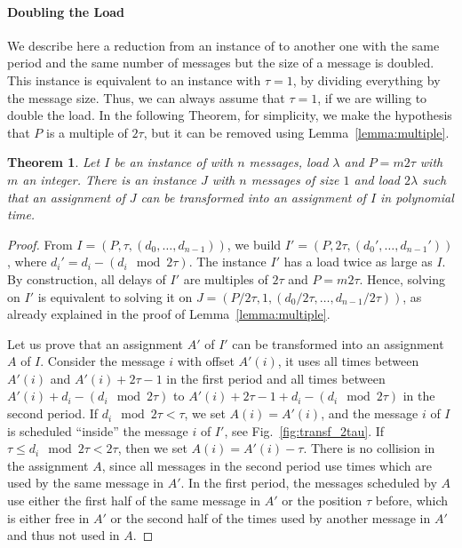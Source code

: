 \documentclass[pdflatex,sn-mathphys,iicol]{sn-jnl}%
\theoremstyle{thmstyleone}%
\newtheorem{theorem}{Theorem}%
\theoremstyle{thmstyletwo}%
\theoremstyle{thmstylethree}%
\begin{document}
\paragraph*{Doubling the Load}

We describe here a reduction from an instance of \pma to another one with the same period and the same number of messages but the size of a message is doubled. This instance is equivalent to an instance with $\tau = 1$, by dividing everything by the message size. Thus, we can always assume that $\tau = 1$, if we are willing to double the load. In the following Theorem, for simplicity, we make the hypothesis that $P$ is a multiple of $2\tau$, but it can be removed using Lemma~\ref{lemma:multiple}. 


\begin{theorem}\label{th:double_load}
Let $I$ be an instance of \pma with $n$ messages, load $\lambda$ and $P=m2\tau$ with $m$ an integer. There is an instance $J$ with $n$ messages of size $1$ and load $2\lambda$ such that an assignment of $J$ can be transformed into an assignment of $I$ in polynomial time.
\end{theorem}
\begin{proof}
From $I = (P,\tau,(d_{0},\dots,d_{n-1}))$, we build $I' = (P, 2\tau, (d_{0}',\dots,d_{n-1}'))$, where $d_i' = d_{i} - (d_{i} \mod 2\tau)$. The instance $I'$ has a load twice as large as $I$.
By construction, all delays of $I'$ are multiples of $2\tau$ and $P = m2\tau$.
Hence, solving \pma on $I'$ is equivalent to solving it on $J = (P/2\tau, 1,(d_{0}/ 2\tau,\dots,d_{n-1} /2\tau))$, as already explained in the proof of Lemma~\ref{lemma:multiple}. 

Let us prove that an assignment $A'$ of $I'$ can be transformed into an assignment $A$ of $I$. 
Consider the message $i$ with offset $A'(i)$, it uses all times between $A'(i)$ and $A'(i) + 2\tau -1$ in the first period and all times between $A'(i) + d_{i} - (d_{i} \mod 2\tau)$ to $A'(i) + 2\tau -1+ d_{i} - (d_{i} \mod 2\tau)$ in the second period. 
If $d_{i} \mod 2\tau < \tau $, we set $A(i) = A'(i)$, and the message $i$ of $I$ is scheduled ``inside'' the 
message $i$ of $I'$, see Fig.~\ref{fig:transf_2tau}. If $\tau \leq d_{i} \mod 2\tau < 2\tau$, then we set 
$A(i) = A'(i) - \tau$. There is no collision in the assignment $A$, since all messages in the second period use times which are used by the same message in $A'$. In the first period, the messages scheduled by $A$ use either the first half of the same message in $A'$ or the position $\tau$ before, which is either free in $A'$ or the second half of the times used by another message in $A'$ and thus not used in $A$. 
\end{proof}
\end{document}
